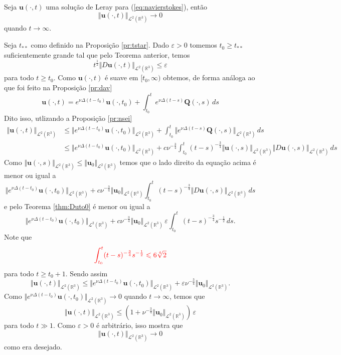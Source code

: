 \documentclass[a4paper, 11pt]{book}
\theoremstyle{definition}
\newcommand{\bR}{\mathbb{R}}
\newcommand{\bu}{\mathbf{u}}
\newcommand{\BQ}{\mathbf{Q}}
\newcommand{\cL}{\mathcal{L}}
\begin{document}
\begin{tbox} \label{thm:problema-leray}
    Seja $\bu(\cdot,t)$ uma solução de Leray para (\ref{eq:navierstokes}), então
    \[
        \Vert \bu(\cdot,t) \Vert_{\cL^2(\bR^3)}\to 0
    \]
    quando $t \to \infty$.
\end{tbox}
\begin{prf}
    Seja $t_{**}$ como definido na Proposição \ref{pr:tstar}.
    Dado $\varepsilon > 0$ tomemos $t_0 \geqslant t_{**}$ suficientemente grande tal que pelo Teorema anterior, temos
    \[
        t^{\frac{1}{2}} \Vert D\bu(\cdot,t) \Vert_{\cL^2(\bR^3)} \leqslant \varepsilon
    \]
    para todo $t \geqslant t_0$.
    Como $\bu(\cdot,t)$ é suave em $[t_0,\infty)$ obtemos, de forma análoga ao que foi feito na Proposição \ref{pr:dav}
    \[
        \bu(\cdot,t) = e^{\nu\Delta(t - t_0)} \bu(\cdot,t_0) + \int_{t_0}^{t} e^{\nu\Delta(t-s)}\BQ(\cdot,s) \, ds
    \]
    Dito isso, utlizando a Proposição \ref{pr:nsei}
    \[
        \begin{aligned}
            \Vert \bu(\cdot,t) \Vert_{\cL^2(\bR^3)} &\leqslant \Vert e^{\nu\Delta(t - t_0)} \bu(\cdot,t_0) \Vert_{\cL^2(\bR^3)} + \int_{t_0}^t \Vert e^{\nu\Delta(t-s)} \BQ(\cdot,s) \Vert_{\cL^2(\bR^3)}\,ds\\
            &\leqslant \Vert e^{\nu\Delta(t - t_0)} \bu(\cdot,t_0) \Vert_{\cL^2(\bR^3)} + c \nu^{-\frac{3}{4}} \int_{t_0}^t (t - s)^{-\frac{3}{4}} \Vert \bu(\cdot,s) \Vert_{\cL^2(\bR^3)} \Vert D\bu(\cdot,s) \Vert_{\cL^2(\bR^3)} \,ds
        \end{aligned}
    \]
    Como $\Vert \bu(\cdot,s) \Vert_{\cL^2(\bR^3)} \leqslant \Vert \bu_{0} \Vert_{\cL^2(\bR^3)}$ temos que o lado direito da equação acima é menor ou igual a
    \[
        \Vert e^{\nu\Delta(t - t_0)} \bu(\cdot,t_0) \Vert_{\cL^2(\bR^3)} + c \nu^{-\frac{3}{4}} \Vert \bu_0 \Vert_{\cL^2(\bR^3)} \int_{t_0}^t (t - s)^{-\frac{3}{4}}\Vert D\bu(\cdot,s) \Vert_{\cL^2(\bR^3)} \,ds
    \]
    e pelo Teorema \ref{thm:Duto0} é menor ou igual a
    \[
        \Vert e^{\nu\Delta(t - t_0)} \bu(\cdot,t_0) \Vert_{\cL^2(\bR^3)} + c \nu^{-\frac{3}{4}} \Vert \bu_0 \Vert_{\cL^2(\bR^3)}\, \varepsilon \! \int_{t_0}^t (t - s)^{-\frac{3}{4}} s^{-\frac{1}{2}} \,ds.
    \]
    Note que
    \[
        \textcolor{red}{\int_{t_0}^t (t - s)^{-\frac{3}{4}}s^{-\frac{1}{2}} \leqslant 6\sqrt[4]{2}}
    \]
    para todo $t \geqslant t_0 + 1$. Sendo assim
    \[
        \Vert \bu(\cdot,t) \Vert_{\cL^2(\bR^3)} \leqslant \Vert e^{\nu\Delta(t - t_0)} \bu(\cdot,t_0) \Vert_{\cL^2(\bR^3)} + \varepsilon\nu^{-\frac{3}{4}} \Vert \bu_0 \Vert_{\cL^2(\bR^3)}.
    \]
    Como $\Vert e^{\nu\Delta(t-t_0)} \bu(\cdot,t_0) \Vert_{\cL^2(\bR^3)} \to 0$ quando $t \to \infty$, temos que
    \[
        \Vert \bu(\cdot,t) \Vert_{\cL^2(\bR^3)} \leqslant (1 +  \nu^{-\frac{3}{4}} \Vert \bu_0 \Vert_{\cL^2(\bR^3)}) \,\varepsilon
    \]
    para todo $t \gg 1$.
    Como $\varepsilon > 0$ é arbitrário, isso mostra que
    \[
        \Vert \bu(\cdot,t) \Vert_{\cL^2(\bR^3)} \to 0
    \]
    como era desejado.
\end{prf}
\end{document}
